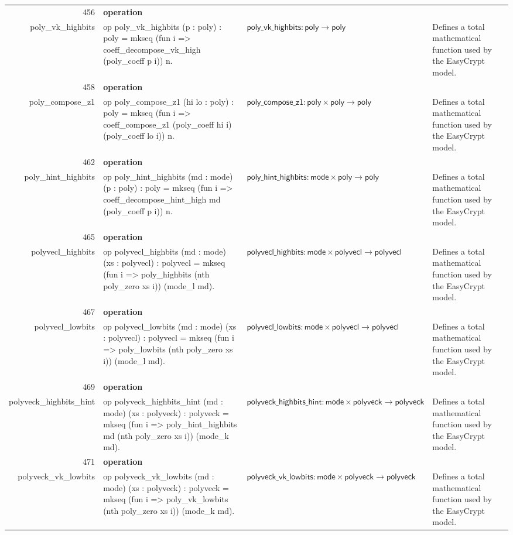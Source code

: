 \documentclass[10pt]{article}
\newcommand{\ec}[1]{\begingroup\ttfamily\scriptsize #1\endgroup}
\begin{document}
\begin{longtable}{r L{0.17\textwidth} L{0.26\textwidth} L{0.27\textwidth} L{0.20\textwidth}}
456 & \textbf{operation}\\\ec{poly\_vk\_highbits} & \ec{op poly\_vk\_highbits (p : poly) : poly = mkseq (fun i => coeff\_decompose\_vk\_high (poly\_coeff p i)) n.} & \(\mathsf{poly\_vk\_highbits} : \mathsf{poly} \to \mathsf{poly}\) & Defines a total mathematical function used by the EasyCrypt model. \\
458 & \textbf{operation}\\\ec{poly\_compose\_z1} & \ec{op poly\_compose\_z1 (hi lo : poly) : poly = mkseq (fun i => coeff\_compose\_z1 (poly\_coeff hi i) (poly\_coeff lo i)) n.} & \(\mathsf{poly\_compose\_z1} : \mathsf{poly} \times \mathsf{poly} \to \mathsf{poly}\) & Defines a total mathematical function used by the EasyCrypt model. \\
462 & \textbf{operation}\\\ec{poly\_hint\_highbits} & \ec{op poly\_hint\_highbits (md : mode) (p : poly) : poly = mkseq (fun i => coeff\_decompose\_hint\_high md (poly\_coeff p i)) n.} & \(\mathsf{poly\_hint\_highbits} : \mathsf{mode} \times \mathsf{poly} \to \mathsf{poly}\) & Defines a total mathematical function used by the EasyCrypt model. \\
465 & \textbf{operation}\\\ec{polyvecl\_highbits} & \ec{op polyvecl\_highbits (md : mode) (xs : polyvecl) : polyvecl = mkseq (fun i => poly\_highbits (nth poly\_zero xs i)) (mode\_l md).} & \(\mathsf{polyvecl\_highbits} : \mathsf{mode} \times \mathsf{polyvecl} \to \mathsf{polyvecl}\) & Defines a total mathematical function used by the EasyCrypt model. \\
467 & \textbf{operation}\\\ec{polyvecl\_lowbits} & \ec{op polyvecl\_lowbits (md : mode) (xs : polyvecl) : polyvecl = mkseq (fun i => poly\_lowbits (nth poly\_zero xs i)) (mode\_l md).} & \(\mathsf{polyvecl\_lowbits} : \mathsf{mode} \times \mathsf{polyvecl} \to \mathsf{polyvecl}\) & Defines a total mathematical function used by the EasyCrypt model. \\
469 & \textbf{operation}\\\ec{polyveck\_highbits\_hint} & \ec{op polyveck\_highbits\_hint (md : mode) (xs : polyveck) : polyveck = mkseq (fun i => poly\_hint\_highbits md (nth poly\_zero xs i)) (mode\_k md).} & \(\mathsf{polyveck\_highbits\_hint} : \mathsf{mode} \times \mathsf{polyveck} \to \mathsf{polyveck}\) & Defines a total mathematical function used by the EasyCrypt model. \\
471 & \textbf{operation}\\\ec{polyveck\_vk\_lowbits} & \ec{op polyveck\_vk\_lowbits (md : mode) (xs : polyveck) : polyveck = mkseq (fun i => poly\_vk\_lowbits (nth poly\_zero xs i)) (mode\_k md).} & \(\mathsf{polyveck\_vk\_lowbits} : \mathsf{mode} \times \mathsf{polyveck} \to \mathsf{polyveck}\) & Defines a total mathematical function used by the EasyCrypt model. \\

\end{longtable}
\end{document}
